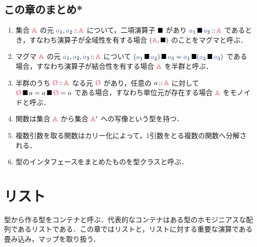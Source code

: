 \documentclass[a5paper,twoside,fleqn,draft]{jsbook}
\begin{document}

\section{この章のまとめ*}

\begin{enumerate}
\item 集合 $\hSet{A}$ の元 $\hVar{a}_1,\hVar{a}_2\hIsTypeOf\hSet{A}$ について，二項演算子 $\operatorname{\blacksquare}$ があり $\hVar{a}_1\hAnyBinOp \hVar{a}_2\hIsTypeOf\hSet{A}$ であるとき，すなわち演算子が全域性を有する場合 $(\hSet{A},\hAnyBinOp)$ のことをマグマと呼ぶ．
\item マグマ $\hSet{A}$ の元 $\hVar{a}_1,\hVar{a}_2,\hVar{a}_3\hIsTypeOf\hSet{A}$ について $(\hVar{a}_1\hAnyBinOp \hVar{a}_2)\hAnyBinOp \hVar{a}_3=\hVar{a}_1\hAnyBinOp(\hVar{a}_2\hAnyBinOp \hVar{a}_3)$ である場合，すなわち演算子が結合性を有する場合 $\hSet{A}$ を半群と呼ぶ．
\item 半群のうち $\mZero\hIsTypeOf\hSet{A}$ なる元 $\mZero$ があり，任意の $a\hIsTypeOf\hSet{A}$ に対して $\mZero\hAnyBinOp a=a\hAnyBinOp\mZero=a$ である場合，すなわち単位元が存在する場合 $\hSet{A}$ をモノイドと呼ぶ．
\item 関数は集合 $\hSet{A}$ から集合 $\hSet{A}'$ への写像という型を持つ．
\item 複数引数を取る関数はカリー化によって，1引数をとる複数の関数へ分解される．
\item 型のインタフェースをまとめたものを型クラスと呼ぶ．
\end{enumerate}

\chapter{リスト}
\label{ch:list}

\begin{leader}
型から作る型をコンテナと呼ぶ．代表的なコンテナはある型のホモジニアスな配列であるリストである．この章ではリストと，リストに対する重要な演算である畳み込み，マップを取り扱う．
\end{leader}
\end{document}
